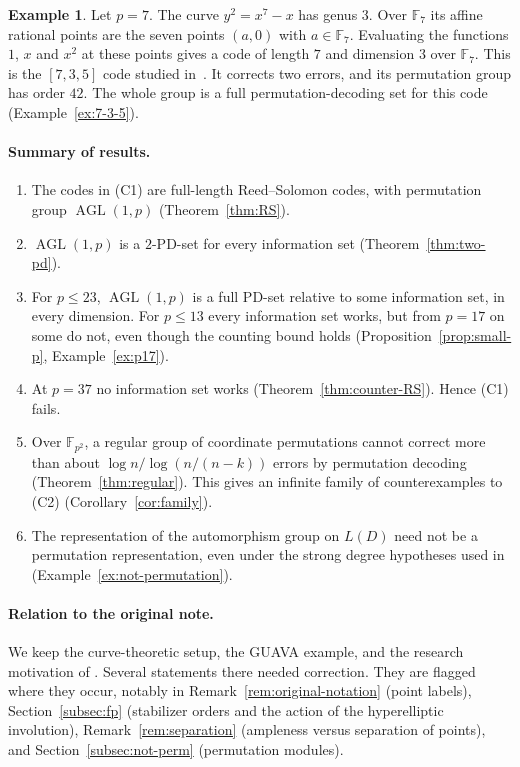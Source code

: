 \documentclass[12pt,letterpaper]{article}
\theoremstyle{definition}
\newtheorem{example}[theorem]{Example}
\theoremstyle{remark}
\numberwithin{equation}{section}
\newcommand{\F}{\mathbb{F}}
\newcommand{\AGL}{\operatorname{AGL}}
\begin{document}
\begin{example}\label{ex:intro-p7}
Let $p=7$. The curve $y^2=x^7-x$ has genus $3$. Over $\F_7$ its affine
rational points are the seven points $(a,0)$ with $a\in\F_7$. Evaluating
the functions $1$, $x$ and $x^2$ at these points gives a code of length
$7$ and dimension $3$ over $\F_7$. This is the $[7,3,5]$ code studied
in~\cite{Jo05}. It corrects two errors, and its permutation group has
order $42$. The whole group is a full permutation-decoding set for this
code (Example~\ref{ex:7-3-5}).
\end{example}

\paragraph{Summary of results.}
\begin{enumerate}
\item The codes in (C1) are full-length Reed--Solomon codes, with
permutation group $\AGL(1,p)$ (Theorem~\ref{thm:RS}).
\item $\AGL(1,p)$ is a $2$-PD-set for every information set
(Theorem~\ref{thm:two-pd}).
\item For $p\le23$, $\AGL(1,p)$ is a full PD-set relative to some
information set, in every dimension.  For $p\le13$ every information set
works, but from $p=17$ on some do not, even though the counting
bound holds (Proposition~\ref{prop:small-p}, Example~\ref{ex:p17}).
\item At $p=37$ no information set works (Theorem~\ref{thm:counter-RS}).
Hence (C1) fails.
\item Over $\F_{p^2}$, a regular group of coordinate permutations cannot
correct more than about $\log n/\log(n/(n-k))$ errors by permutation
decoding (Theorem~\ref{thm:regular}).  This gives an infinite family of
counterexamples to (C2) (Corollary~\ref{cor:family}).
\item The representation of the automorphism group on $L(D)$ need not be
a permutation representation, even under the strong degree hypotheses
used in \cite{Jo05} (Example~\ref{ex:not-permutation}).
\end{enumerate}

\paragraph{Relation to the original note.}
We keep the curve-theoretic setup, the GUAVA example, and the research
motivation of \cite{Jo05}.  Several statements there needed correction.
They are flagged where they occur, notably in
Remark~\ref{rem:original-notation} (point labels),
Section~\ref{subsec:fp} (stabilizer orders and the action of the
hyperelliptic involution), Remark~\ref{rem:separation} (ampleness versus
separation of points), and Section~\ref{subsec:not-perm} (permutation
modules).
\end{document}
